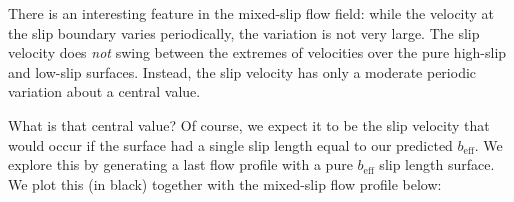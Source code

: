 \documentclass[a4paper]{report}
\newcommand{\beff}{\ensuremath{b_{\mathrm{eff}}}}
\begin{document}
\begin{center}
\end{center}

There is an interesting feature in the mixed-slip flow field: while the velocity at the slip boundary varies periodically, the variation is not very large.  The slip velocity does \emph{not} swing between the extremes of velocities over the pure high-slip and low-slip surfaces.  Instead, the slip velocity has only a moderate periodic variation about a central value.

What is that central value?  Of course, we expect it to be the slip velocity that would occur if the surface had a single slip length equal to our predicted $\beff$.
We explore this by generating a last flow profile with a pure $\beff$ slip length surface.  We plot this (in black) together with the mixed-slip flow profile below:
\end{document}
